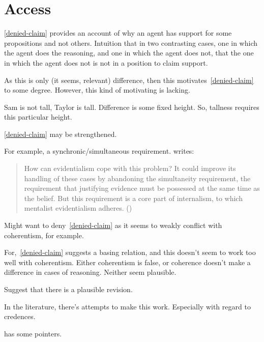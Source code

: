 
\chapter{Access}
\label{cha:access}

\begin{note}
  \ref{denied-claim} provides an account of why an agent has support for some propositions and not others.
  Intuition that in two contrasting cases, one in which the agent does the reasoning, and one in which the agent does not, that the one in which the agent does not is not in a position to claim support.

  As this is only (it seems, relevant) difference, then this motivates~\ref{denied-claim} to some degree.
  However, this kind of motivating is lacking.

  Sam is not tall, Taylor is tall.
  Difference is some fixed height.
  So, tallness requires this particular height.
\end{note}

\begin{note}
  \ref{denied-claim} may be strengthened.

  For example, a synchronic/simultaneous requirement.
  \citeauthor{Goldman:2011vn} writes:
  \begin{quote}
    How can evidentialism cope with this problem? It could improve its handling of these cases by abandoning the simultaneity requirement, the requirement that justifying evidence must be possessed at the same time as the belief. But this requirement is a core part of internalism, to which mentalist evidentialism adheres.\nolinebreak
    \mbox{}\hfill\mbox{(\citeyear[261]{Goldman:2011vn})}
  \end{quote}
\end{note}

\begin{note}
  Might want to deny~\ref{denied-claim} as it seems to weakly conflict with coherentism, for example.

  For,~\ref{denied-claim} suggests a basing relation, and this doesn't seem to work too well with coherentism.
  Either coherentism is false, or coherence doesn't make a difference in cases of reasoning.
  Neither seem plausible.

  Suggest that there is a plausible revision.

  In the literature, there's attempts to make this work.
  Especially with regard to credences.

  \textcite[\S2]{Silva:2020aa} has some pointers.
\end{note}

